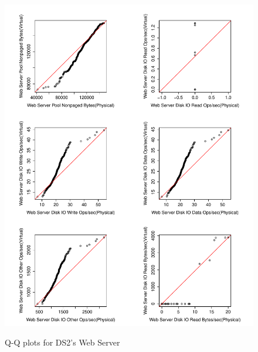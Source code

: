 \begin{figure}[tbh]
	\centering
	{\includegraphics[width=1.0\textwidth]{figures/appendix/qq_plots/DS2/Web_Server/Third_six.pdf}}
	\caption{Q-Q plots for DS2's Web Server}
\end{figure}


